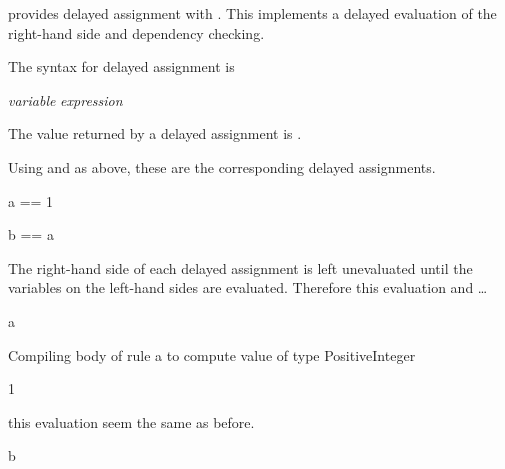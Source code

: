 {\Language{} provides delayed assignment with \spadSyntax{==}.
This implements a
delayed evaluation of the right-hand side and dependency
checking.

\beginImportant
The syntax for delayed assignment is
\begin{center}
{\it variable} \spad{==} {\it expression}
\end{center}
The value returned by a delayed assignment is \void{}.
\endImportant

\begin{xtc}
\begin{xtccomment}
Using  and  as above, these are the corresponding delayed
assignments.
\end{xtccomment}
\begin{spadsrc}
a == 1 
\end{spadsrc}
\end{xtc}
\begin{xtc}
\begin{xtccomment}
\end{xtccomment}
\begin{spadsrc}
b == a 
\end{spadsrc}
\end{xtc}
\begin{xtc}
\begin{xtccomment}
The right-hand side of each delayed assignment
is left unevaluated until the
variables on the left-hand sides are evaluated.
Therefore this evaluation and \ldots
\end{xtccomment}
\begin{spadsrc}
a 
\end{spadsrc}
\begin{MessageOutput}
   Compiling body of rule a to compute value of type PositiveInteger 
\end{MessageOutput}
\begin{TeXOutput}
\begin{fricasmath}{7}
1%
\end{fricasmath}
\end{TeXOutput}
\end{xtc}
\begin{xtc}
\begin{xtccomment}
this evaluation seem the same as before.
\end{xtccomment}
\begin{spadsrc}
b 
\end{spadsrc}
\begin{MessageOutput}

\end{MessageOutput}
\end{xtc}}
